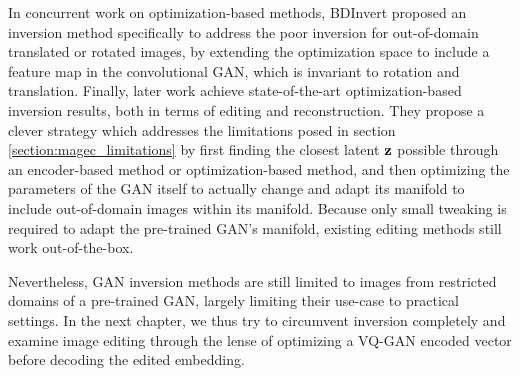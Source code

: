 In  concurrent work on optimization-based methods, 
BDInvert \citep{kang2021gan} proposed an inversion method specifically to address the 
poor inversion for out-of-domain translated or rotated images, by extending the 
optimization space to include a feature map in the convolutional \ac{GAN}, which is invariant
to rotation and translation. Finally, later work \citep{feng2022near} achieve 
state-of-the-art optimization-based inversion results, both in terms of editing and reconstruction.
They propose a clever strategy which addresses the limitations posed in section \ref{section:magec_limitations}
by first finding the closest latent $\mathbf{z}$ possible through an encoder-based method 
or optimization-based method, and then optimizing the parameters of the \ac{GAN}
itself to actually change and adapt its manifold to include out-of-domain images 
within its manifold. Because only small tweaking is required to adapt the pre-trained 
\ac{GAN}'s manifold, existing editing methods still work out-of-the-box.

Nevertheless, \ac{GAN} inversion methods are still limited to images from restricted 
domains of a pre-trained \ac{GAN}, largely limiting their use-case to practical settings. 
In the next chapter, we thus try to circumvent inversion completely and examine image 
editing through the lense of optimizing a VQ-GAN \citep{esser2021taming} encoded vector 
before decoding the edited embedding. 

